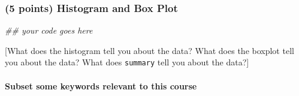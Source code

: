 \documentclass[
]{article}
\newenvironment{Shaded}{\begin{snugshade}}{\end{snugshade}}
\newcommand{\CommentTok}[1]{\textcolor[rgb]{0.56,0.35,0.01}{\textit{#1}}}
\begin{document}
\hypertarget{points-histogram-and-box-plot}{%
\subsubsection{(5 points) Histogram and Box
Plot}\label{points-histogram-and-box-plot}}

\begin{Shaded}
\begin{Highlighting}[]
\CommentTok{\#\# your code goes here }
\end{Highlighting}
\end{Shaded}

{[}What does the histogram tell you about the data? What does the
boxplot tell you about the data? What does \texttt{summary} tell you
about the data?{]}

\hypertarget{subset-some-keywords-relevant-to-this-course}{%
\paragraph{Subset some keywords relevant to this
course}\label{subset-some-keywords-relevant-to-this-course}}
\end{document}
